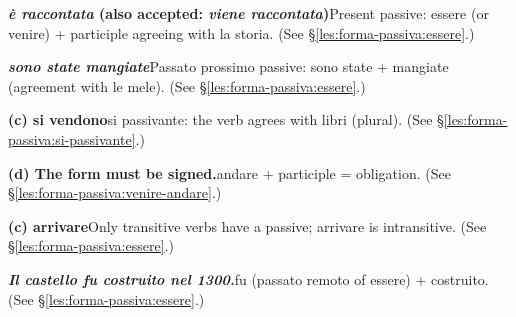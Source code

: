 \documentclass[11pt,a4paper,twoside,openright]{book}
\newcommand{\answerheading}[1]{\par\medskip\noindent{\sffamily\bfseries\small #1}\par\nopagebreak}
\begin{document}
\answerheading{\S\ref{les:forma-passiva} The passive voice}\label{ans:forma-passiva}
\begin{answers}
\item\relax \textbf{\textit{è raccontata} {\color{muted}(also accepted: \textit{viene raccontata})}}\newline Present passive: essere (or venire) + participle agreeing with la storia. {\color{muted}(See \S\ref{les:forma-passiva:essere}.)}
\item\relax \textbf{\textit{sono state mangiate}}\newline Passato prossimo passive: sono state + mangiate (agreement with le mele). {\color{muted}(See \S\ref{les:forma-passiva:essere}.)}
\item\relax \textbf{(c) si vendono}\newline si passivante: the verb agrees with libri (plural). {\color{muted}(See \S\ref{les:forma-passiva:si-passivante}.)}
\item\relax \textbf{(d) The form must be signed.}\newline andare + participle = obligation. {\color{muted}(See \S\ref{les:forma-passiva:venire-andare}.)}
\item\relax \textbf{(c) arrivare}\newline Only transitive verbs have a passive; arrivare is intransitive. {\color{muted}(See \S\ref{les:forma-passiva:essere}.)}
\item\relax \textbf{\textit{Il castello fu costruito nel 1300.}}\newline fu (passato remoto of essere) + costruito. {\color{muted}(See \S\ref{les:forma-passiva:essere}.)}
\end{answers}
\end{document}
